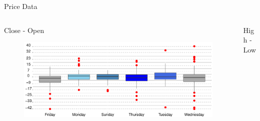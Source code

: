 \documentclass[final, xcolor=table]{beamer}\usepackage[]{graphicx}\usepackage[]{color}
\begin{document}
\begin{columns}[t]
\begin{column}{.32 \linewidth}
\begin{block}{Price Data}
 
 
  \end{block}
  
\end{column}

\end{columns}



\begin{columns}[t]


\begin{column}{.49 \linewidth}

  \begin{block}{Close - Open}

    \begin{figure}[H]
      \includegraphics[scale=1]{figure/BP_Plot-1.pdf}
    \end{figure}
    
  \end{block}
  
\end{column}


\begin{column}{.49 \linewidth}

  \begin{block}{High - Low}


\end{block}
\end{column}
\end{columns}
\end{document}
